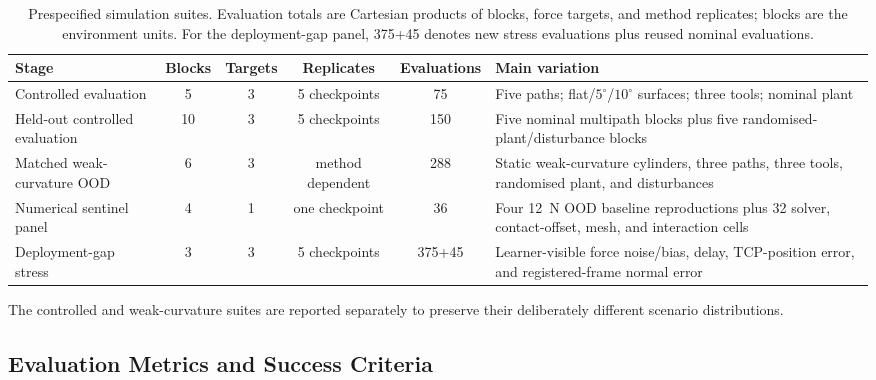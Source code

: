 \begin{table}[t]
\centering
\caption{Prespecified simulation suites. Evaluation totals are Cartesian
products of blocks, force targets, and method replicates; blocks are the
environment units. For the deployment-gap panel, 375+45 denotes new stress
evaluations plus reused nominal evaluations.}
\label{tab:evaluation_suites}
\small
\setlength{\tabcolsep}{4.5pt}
\begin{tabular}{@{}lccccp{6.1cm}@{}}
\toprule
Stage & Blocks & Targets & Replicates & Evaluations & Main variation \\
\midrule
Controlled evaluation
& 5 & 3 & 5 checkpoints & 75
& Five paths; flat/$5^{\circ}$/$10^{\circ}$ surfaces; three tools; nominal plant \\
Held-out controlled evaluation
& 10 & 3 & 5 checkpoints & 150
& Five nominal multipath blocks plus five randomised-plant/disturbance blocks \\
Matched weak-curvature OOD
& 6 & 3 & method dependent & 288
& Static weak-curvature cylinders, three paths, three tools, randomised plant, and disturbances \\
Numerical sentinel panel
& 4 & 1 & one checkpoint & 36
& Four 12~N OOD baseline reproductions plus 32 solver, contact-offset, mesh, and interaction cells \\
Deployment-gap stress
& 3 & 3 & 5 checkpoints & 375+45
& Learner-visible force noise/bias, delay, TCP-position error, and registered-frame normal error \\
\bottomrule
\end{tabular}
\end{table}

The controlled and weak-curvature suites are reported separately to preserve
their deliberately different scenario distributions.

\subsection{Evaluation Metrics and Success Criteria}
\label{subsec:metrics}

